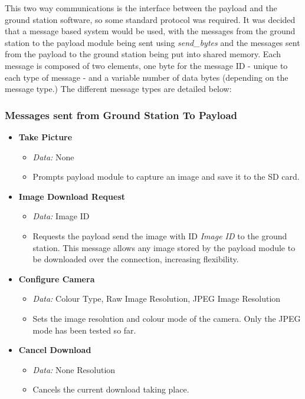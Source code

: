 This two way communications is the interface between the payload and the 
ground station software, so some standard protocol was required. It was decided
that a message based system would be used, with the messages from the ground
station to the payload module being sent using \emph{send\_bytes} and the 
messages sent from the payload to the ground station being put into shared
memory. Each message is composed of two elements, one byte for the message ID 
- unique to each type of message - and a variable number of data bytes 
(depending on the message type.) The different message types are detailed 
below:

\subsubsection*{Messages sent from Ground Station To Payload}

\begin{itemize}
\item \textbf{Take Picture}
\begin{itemize}
\item \emph{Data:} None
\item Prompts payload module to capture an image and save it to the SD card.
\end{itemize}

\item \textbf{Image Download Request} 
\begin{itemize}

\item \emph{Data:} Image ID
\item Requests the payload send the image with ID \emph{Image ID} to the 
ground station. This message allows any image stored by the payload module 
to be downloaded over the connection, increasing flexibility. 
\end{itemize}

\item \textbf{Configure Camera}
\begin{itemize}
\item \emph{Data:} Colour Type, Raw Image Resolution, JPEG Image
Resolution
\item Sets the image resolution and colour mode of the camera. Only the 
JPEG mode has been tested so far.
\end{itemize}

\item \textbf{Cancel Download}
\begin{itemize}
\item \emph{Data:} None
Resolution
\item Cancels the current download taking place.
\end{itemize}

\end{itemize}

